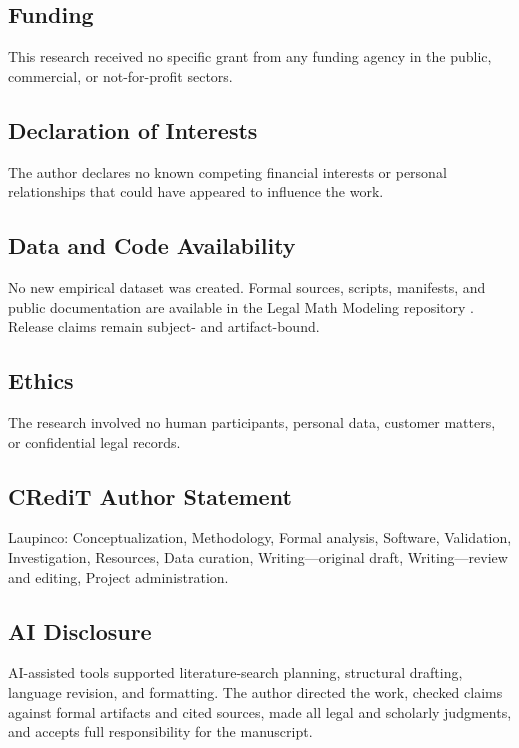 \subsection*{Funding}

This research received no specific grant from any funding agency in the public, commercial, or not-for-profit sectors.

\subsection*{Declaration of Interests}

The author declares no known competing financial interests or personal relationships that could have appeared to influence the work.

\subsection*{Data and Code Availability}

No new empirical dataset was created. Formal sources, scripts, manifests, and public documentation are available in the Legal Math Modeling repository \citep{LegalMathModeling2026}. Release claims remain subject- and artifact-bound.

\subsection*{Ethics}

The research involved no human participants, personal data, customer matters, or confidential legal records.

\subsection*{CRediT Author Statement}

Laupinco: Conceptualization, Methodology, Formal analysis, Software, Validation, Investigation, Resources, Data curation, Writing---original draft, Writing---review and editing, Project administration.

\subsection*{AI Disclosure}

AI-assisted tools supported literature-search planning, structural drafting, language revision, and formatting. The author directed the work, checked claims against formal artifacts and cited sources, made all legal and scholarly judgments, and accepts full responsibility for the manuscript.

